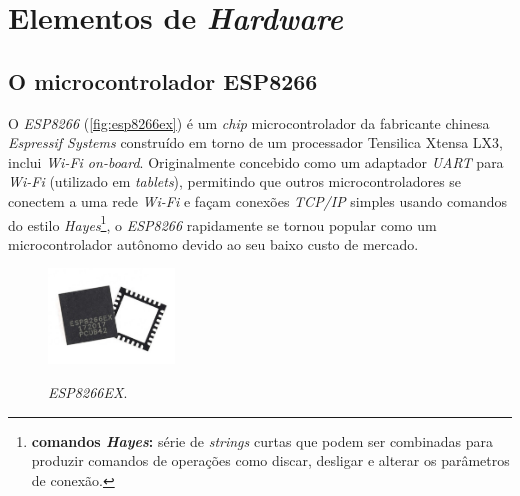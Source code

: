 \begin{table}[H]
	\centering
	\caption{Caracteres especiais utilizados para envio e recebimento no protocolo MQTT.}
	\label{tab:simbolos_mqtt}
\end{table}

\section{Elementos de \textit{Hardware}}
\subsection{O microcontrolador ESP8266}

O \textit{ESP8266} (\autoref{fig:esp8266ex}) é um \textit{chip} microcontrolador da fabricante chinesa \textit{Espressif Systems} construído em torno de um processador Tensilica Xtensa LX3, inclui \textit{Wi-Fi on-board}. Originalmente concebido como um adaptador \textit{UART} para \textit{Wi-Fi} (utilizado em \textit{tablets}), permitindo que outros microcontroladores se conectem a uma rede \textit{Wi-Fi} e façam conexões \textit{TCP/IP} simples usando comandos do estilo \textit{Hayes}\footnote{\textbf{comandos \textit{Hayes}:} série de \textit{strings} curtas que podem ser combinadas para produzir comandos de operações como discar, desligar e alterar os parâmetros de conexão.}, o \textit{ESP8266} rapidamente se tornou popular como um microcontrolador autônomo devido ao seu baixo custo de mercado.

\begin{figure}[H]
	\centering
	\caption{\textit{ESP8266EX}.}
	\includegraphics[width=0.3\textwidth]{figuras/esp8266ex.jpg}
	\label{fig:esp8266ex}
\end{figure} 


